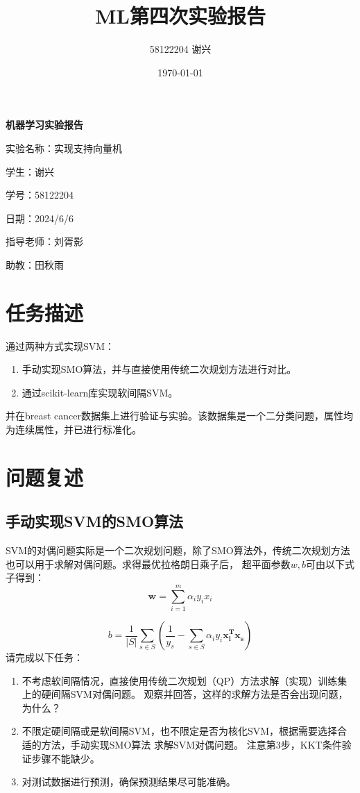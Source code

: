 \documentclass[12pt]{article}
\title{\textbf{ML第四次实验报告}}
\author{58122204 谢兴}
\date{\today}
\begin{document}
\begin{titlepage}
  \centering
  \vspace*{60pt}
  \Huge\textbf{机器学习实验报告}

  \vspace{100pt}
  \Large
  实验名称：实现支持向量机

  \vspace{25pt}
  学生：谢兴

  \vspace{25pt}
  学号：58122204

  \vspace{25pt}
  日期：2024/6/6

  \vspace{25pt}
  指导老师：刘胥影

  \vspace{25pt}
  助教：田秋雨



\end{titlepage}


\newpage
\tableofcontents


\section{任务描述}
通过两种方式实现SVM：
\begin{enumerate}
  \item 手动实现SMO算法，并与直接使用传统二次规划方法进行对比。
  \item 通过scikit-learn库实现软间隔SVM。
\end{enumerate}
并在breast cancer数据集上进行验证与实验。该数据集是一个二分类问题，属性均为连续属性，并已进行标准化。


\section{问题复述}
\subsection{手动实现SVM的SMO算法}
SVM的对偶问题实际是一个二次规划问题，除了SMO算法外，传统二次规划方法也可以用于求解对偶问题。求得最优拉格朗日乘子后，
超平面参数$w, b$可由以下式子得到：
\begin{equation}
  \textbf{w} = \sum_{i=1}^{m} \alpha_{i}y_{i}x_{i}
\end{equation}

\begin{equation}
  b=\frac{1}{|S|}\sum_{s\in S}(\frac{1}{y_{s}}-\sum_{s\in S}\alpha_{i}y_{i}\mathbf{x_{i}^{T}x_{s}})
\end{equation}
请完成以下任务：
\begin{enumerate}
  \item 不考虑软间隔情况，直接使用传统二次规划（QP）方法求解（实现）训练集上的硬间隔SVM对偶问题。
        观察并回答，这样的求解方法是否会出现问题，为什么？
  \item 不限定硬间隔或是软间隔SVM，也不限定是否为核化SVM，根据需要选择合适的方法，手动实现SMO算法 求解SVM对偶问题。
        注意第3步，KKT条件验证步骤不能缺少。
  \item 对测试数据进行预测，确保预测结果尽可能准确。
\end{enumerate}
\end{document}
